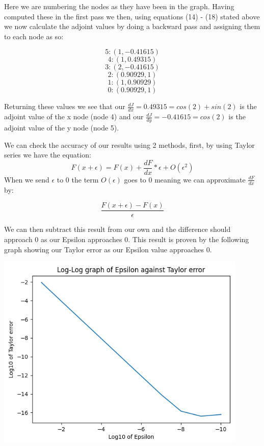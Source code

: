 \documentclass{article}
\begin{document}
Here we are numbering the nodes as they have been in the graph. Having computed these in the first pass we then, using equations (14) - (18) stated above we now calculate the adjoint values by doing a backward pass and assigning them to each node as so:

\begin{equation*}
    5: (1, -0.41615)
\end{equation*}
\begin{equation*}
    4: (1, 0.49315)
\end{equation*}
\begin{equation*}
    3: (2, -0.41615)
\end{equation*}
\begin{equation*}
    2: (0.90929, 1)
\end{equation*}
\begin{equation*}
    1: (1, 0.90929)
\end{equation*}
\begin{equation*}
    0: (0.90929, 1)
\end{equation*}

Returning these values we see that our $\frac{dJ}{dx} = 0.49315 = cos(2) + sin(2)$ is the adjoint value of the x node (node 4) and our $\frac{dJ}{dy} = -0.41615 = cos(2)$ is the adjoint value of the y node (node 5).

We can check the accuracy of our results using 2 methods, first, by using Taylor series we have the equation:
\begin{equation}
    F(x + \epsilon) = F(x) + \frac{dF}{dx} * \epsilon + O(\epsilon ^ 2)
\end{equation}
When we send $\epsilon$ to 0 the term $O(\epsilon)$ goes to 0 meaning we can approximate $\frac{dF}{dx}$ by:

\begin{equation}
    \frac{F(x + \epsilon) - F(x)}{\epsilon}
\end{equation}

We can then subtract this result from our own and the difference should approach 0 as our Epsilon approaches 0. This result is proven by the following graph showing our Taylor error as our Epsilon value approaches 0.

\begin{center}
    \includegraphics[width=12cm]{images/Taylor_error_1.png}
\end{center}
\end{document}
